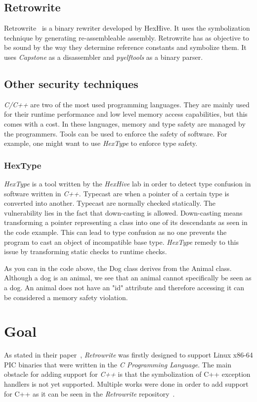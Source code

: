 \documentclass[a4paper,11pt,oneside]{report}
\begin{document}
\section{Retrowrite}
Retrowrite~\cite{dinesh20oakland} is a binary rewriter developed by HexHive.
It uses the symbolization technique by generating re-assembleable assembly.
Retrowrite has as objective to be sound by the way they determine reference
constants and symbolize them. It uses
\textit{Capstone} as a disassembler and \textit{pyelftools} as a binary parser.

\section{Other security techniques}
\textit{C/C++} are two of the most used programming languages. They are
mainly used for their runtime performance and low level memory access
capabilities, but this comes with a cost. In these languages, memory and type
safety are managed by the programmers. Tools can be used to enforce the safety
of software. For example, one might want to use \textit{HexType} to enforce
type safety.

\subsection{HexType}
\textit{HexType} is a tool written by the \textit{HexHive} lab in order to
detect type confusion in software written in \textit{C++}. Typecast are when a
pointer of a certain type is converted into another. Typecast are
normally checked statically. The vulnerability lies in the fact that
down-casting is allowed. Down-casting means transforming a pointer representing
a class into one of its descendants as seen in the code example. This can lead
to type confusion as no one prevents the program to cast an object of
incompatible base type. \textit{HexType} remedy to this issue by transforming
static checks to runtime checks.


As you can in the code above, the Dog class derives from the Animal class.
Although a dog is an animal, we see that an animal cannot specifically be seen
as a dog. An animal does not have an "id" attribute and therefore accessing it
can be considered a memory safety violation.


\chapter{Goal}
As stated in their paper~\cite{dinesh20oakland}, \textit{Retrowrite} was
firstly designed to support Linux x86-64 PIC binaries that were written in the
\textit{C Programming Language}. The main obstacle for adding support for
\textit{C++} is that the symbolization of C++ exception
handlers is not yet supported. Multiple works were done in order to add support
for C++ as it can be seen in the \textit{Retrowrite} repository~\cite{gitCommit}.
\end{document}
